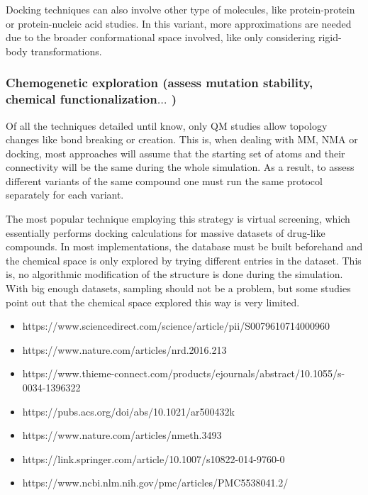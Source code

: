 Docking techniques can also involve other type of molecules, like protein-protein or protein-nucleic acid studies. In this variant, more approximations are needed due to the broader conformational space involved, like only considering rigid-body transformations.

\subsubsection{Chemogenetic exploration (assess mutation stability, chemical functionalization$ \ldots $ )}
Of all the techniques detailed until know, only QM studies allow topology changes like bond breaking or creation. This is, when dealing with MM, NMA or docking, most approaches will assume that the starting set of atoms and their connectivity will be the same during the whole simulation. As a result, to assess different variants of the same compound one must run the same protocol separately for each variant.

The most popular technique employing this strategy is virtual screening, which essentially performs docking calculations for massive datasets of drug-like compounds. In most implementations, the database must be built beforehand and the chemical space is only explored by trying different entries in the dataset. This is, no algorithmic modification of the structure is done during the simulation. With big enough datasets, sampling should not be a problem, but some studies point out that the chemical space explored this way is very limited.\cite{virshup2013stochastic}



\begin{itemize}
	\item https://www.sciencedirect.com/science/article/pii/S0079610714000960

	\item https://www.nature.com/articles/nrd.2016.213

	\item https://www.thieme-connect.com/products/ejournals/abstract/10.1055/s-0034-1396322

	\item https://pubs.acs.org/doi/abs/10.1021/ar500432k

	\item https://www.nature.com/articles/nmeth.3493

	\item https://link.springer.com/article/10.1007/s10822-014-9760-0

	\item https://www.ncbi.nlm.nih.gov/pmc/articles/PMC5538041.2/
\end{itemize}

